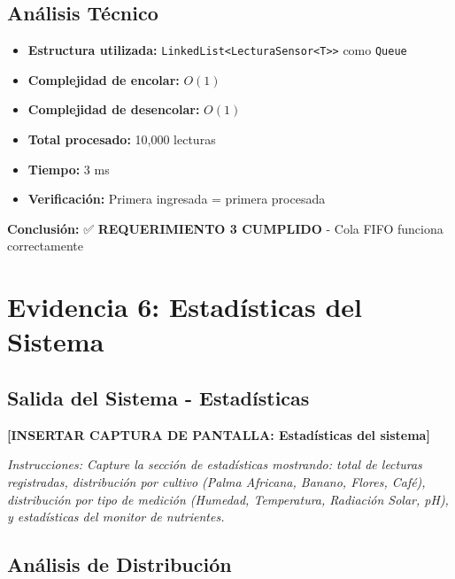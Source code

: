 \documentclass[12pt,a4paper]{article}
\begin{document}
\subsection{Análisis Técnico}

\begin{itemize}
    \item \textbf{Estructura utilizada:} \texttt{LinkedList<LecturaSensor<T>>} como \texttt{Queue}
    \item \textbf{Complejidad de encolar:} $O(1)$
    \item \textbf{Complejidad de desencolar:} $O(1)$
    \item \textbf{Total procesado:} 10,000 lecturas
    \item \textbf{Tiempo:} 3 ms
    \item \textbf{Verificación:} Primera ingresada = primera procesada
\end{itemize}

\textbf{Conclusión:} ✅ \textbf{REQUERIMIENTO 3 CUMPLIDO} - Cola FIFO funciona correctamente


\section{Evidencia 6: Estadísticas del Sistema}

\subsection{Salida del Sistema - Estadísticas}

\begin{tcolorbox}[colback=blue!5,colframe=blue!75!black,title=\textbf{ESTADÍSTICAS GENERALES}]
\vspace{0.5cm}
\textbf{[INSERTAR CAPTURA DE PANTALLA: Estadísticas del sistema]}

\textit{Instrucciones: Capture la sección de estadísticas mostrando: total de lecturas registradas, distribución por cultivo (Palma Africana, Banano, Flores, Café), distribución por tipo de medición (Humedad, Temperatura, Radiación Solar, pH), y estadísticas del monitor de nutrientes.}
\vspace{0.5cm}
\end{tcolorbox}

\subsection{Análisis de Distribución}
\end{document}
